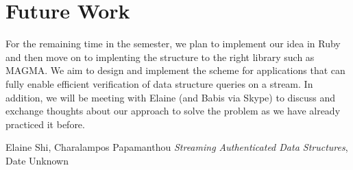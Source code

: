 \documentclass[11pt, letterpaper, oneside]{article}
\begin{document}
\section{Future Work}

For the remaining time in the semester, we plan to implement our idea in Ruby and then move on to implenting the structure to the right library such as MAGMA. We aim to design and implement the scheme for applications that can fully enable efficient verification of data structure queries on a stream.
In addition, we will be meeting with Elaine (and Babis via Skype) to discuss and exchange thoughts about our approach to solve the problem as we have already practiced it before.


\begin{thebibliography}{9}
	 Elaine Shi, Charalampos Papamanthou \emph{Streaming Authenticated Data Structures}, Date Unknown
\end{thebibliography}
\end{document}
